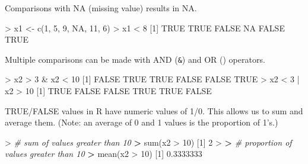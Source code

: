 \documentclass[
]{book}
\newenvironment{Shaded}{\begin{snugshade}}{\end{snugshade}}
\newcommand{\CommentTok}[1]{\textcolor[rgb]{0.56,0.35,0.01}{\textit{#1}}}
\newcommand{\ConstantTok}[1]{\textcolor[rgb]{0.00,0.00,0.00}{#1}}
\newcommand{\DecValTok}[1]{\textcolor[rgb]{0.00,0.00,0.81}{#1}}
\newcommand{\ErrorTok}[1]{\textcolor[rgb]{0.64,0.00,0.00}{\textbf{#1}}}
\newcommand{\FloatTok}[1]{\textcolor[rgb]{0.00,0.00,0.81}{#1}}
\newcommand{\FunctionTok}[1]{\textcolor[rgb]{0.00,0.00,0.00}{#1}}
\newcommand{\NormalTok}[1]{#1}
\newcommand{\OtherTok}[1]{\textcolor[rgb]{0.56,0.35,0.01}{#1}}
\newcommand{\SpecialCharTok}[1]{\textcolor[rgb]{0.00,0.00,0.00}{#1}}
\begin{document}
Comparisons with NA (missing value) results in NA.

\begin{Shaded}
\begin{Highlighting}[]
\SpecialCharTok{\textgreater{}}\NormalTok{ x1 }\OtherTok{\textless{}{-}} \FunctionTok{c}\NormalTok{(}\DecValTok{1}\NormalTok{, }\DecValTok{5}\NormalTok{, }\DecValTok{9}\NormalTok{, }\ConstantTok{NA}\NormalTok{, }\DecValTok{11}\NormalTok{, }\DecValTok{6}\NormalTok{)}
\SpecialCharTok{\textgreater{}}\NormalTok{ x1 }\SpecialCharTok{\textless{}} \DecValTok{8}
\NormalTok{[}\DecValTok{1}\NormalTok{]  }\ConstantTok{TRUE}  \ConstantTok{TRUE} \ConstantTok{FALSE}    \ConstantTok{NA} \ConstantTok{FALSE}  \ConstantTok{TRUE}
\end{Highlighting}
\end{Shaded}

Multiple comparisons can be made with AND (\texttt{\&}) and OR (\texttt{\textbar{}}) operators.

\begin{Shaded}
\begin{Highlighting}[]
\SpecialCharTok{\textgreater{}}\NormalTok{ x2 }\SpecialCharTok{\textgreater{}} \DecValTok{3} \SpecialCharTok{\&}\NormalTok{ x2 }\SpecialCharTok{\textless{}} \DecValTok{10}
\NormalTok{[}\DecValTok{1}\NormalTok{] }\ConstantTok{FALSE}  \ConstantTok{TRUE}  \ConstantTok{TRUE} \ConstantTok{FALSE} \ConstantTok{FALSE}  \ConstantTok{TRUE}
\SpecialCharTok{\textgreater{}}\NormalTok{ x2 }\SpecialCharTok{\textless{}} \DecValTok{3} \SpecialCharTok{|}\NormalTok{ x2 }\SpecialCharTok{\textgreater{}} \DecValTok{10}
\NormalTok{[}\DecValTok{1}\NormalTok{]  }\ConstantTok{TRUE} \ConstantTok{FALSE} \ConstantTok{FALSE}  \ConstantTok{TRUE}  \ConstantTok{TRUE} \ConstantTok{FALSE}
\end{Highlighting}
\end{Shaded}

TRUE/FALSE values in R have numeric values of 1/0. This allows us to sum and average them. (Note: an average of 0 and 1 values is the proportion of 1's.)

\begin{Shaded}
\begin{Highlighting}[]
\SpecialCharTok{\textgreater{}} \CommentTok{\# sum of values greater than 10}
\ErrorTok{\textgreater{}} \FunctionTok{sum}\NormalTok{(x2 }\SpecialCharTok{\textgreater{}} \DecValTok{10}\NormalTok{)}
\NormalTok{[}\DecValTok{1}\NormalTok{] }\DecValTok{2}
\SpecialCharTok{\textgreater{}} 
\ErrorTok{\textgreater{}} \CommentTok{\# proportion of values greater than 10}
\ErrorTok{\textgreater{}} \FunctionTok{mean}\NormalTok{(x2 }\SpecialCharTok{\textgreater{}} \DecValTok{10}\NormalTok{)}
\NormalTok{[}\DecValTok{1}\NormalTok{] }\FloatTok{0.3333333}
\end{Highlighting}
\end{Shaded}
\end{document}

